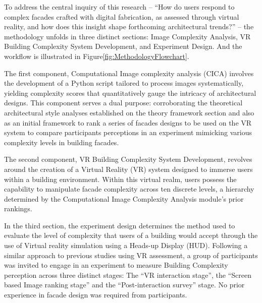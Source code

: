 
To address the central inquiry of this research – ``How do users respond to complex facades crafted with digital fabrication, as assessed through virtual reality, and how does this insight shape forthcoming architectural trends?'' – the methodology unfolds in three distinct sections: Image Complexity Analysis, VR Building Complexity System Development, and Experiment Design.
And the workflow is illustrated in Figure\ref{fig:MethodologyFlowchart}.

The first component, Computational Image complexity analysis (CICA) involves the development of a Python script tailored to process images systematically, yielding complexity scores that quantitatively gauge the intricacy of architectural designs.
This component serves a dual purpose: corroborating the theoretical architectural style analyses established on the theory framework section and also as an initial framework to rank a series of facades designs to be used on the VR system to compare participants perceptions in an experiment mimicking various complexity levels in building facades.

The second component, VR Building Complexity System Development, revolves around the creation of a Virtual Reality (VR) system designed to immerse users within a building environment.
Within this virtual realm, users possess the capability to manipulate facade complexity across ten discrete levels, a hierarchy determined by the Computational Image Complexity Analysis module's prior rankings.

In the third section, the experiment design determines the method used to evaluate the level of complexity that users of a building would accept through the use of Virtual reality simulation using a Heads-up Display (HUD).
Following a similar approach to previous studies using VR assessment\cite{Wolfartsberger2019}, a group of participants was invited to engage in an experiment to measure Building Complexity perception across three distinct stages: The ``VR interaction stage'', the ``Screen based Image ranking stage'' and the ``Post-interaction survey'' stage.
No prior experience in facade design was required from participants.


